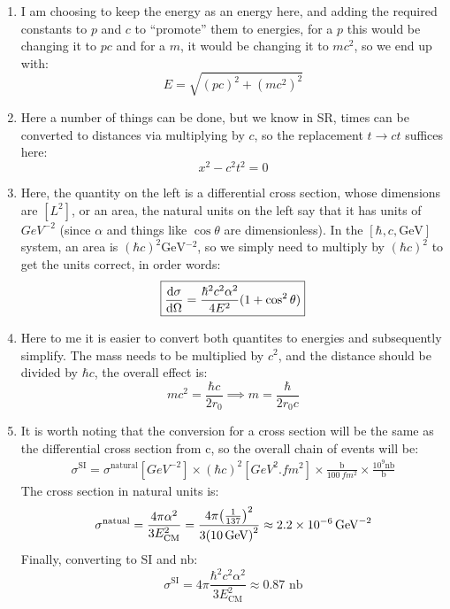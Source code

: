 \documentclass[12pt]{article}
\begin{document}
\begin{enumerate}[label = (\alph*)]
\item I am choosing to keep the energy as an energy here, and adding the required constants to $p$ and $c$ to ``promote'' them to energies, for a $p$ this would be changing it to $pc$ and for a $m$, it would be changing it to $mc^2$, so we end up with:
  \begin{equation}
    \label{eq:p1a}
    \boxed{E=\sqrt{{(pc)}^2+{(mc^2)}^2}}
  \end{equation}
\item Here a number of things can be done, but we know in SR, times can be converted to distances via multiplying by $c$, so the replacement $t\to ct$ suffices here:
  \begin{equation}
    \label{eq:p1c}
    \boxed{x^2-c^2t^2=0}
  \end{equation}
\item Here, the quantity on the left is a differential cross section, whose dimensions are $[L^2]$, or an area, the natural units on the left say that it has units of $\unit{GeV^{-2}}$ (since $\alpha$ and things like $\cos\theta$ are dimensionless). In the $[\hbar,c,\unit{\GeV}]$ system, an area is ${(\hbar c)}^2\unit{\GeV^{-2}}$, so we simply need to multiply by ${(\hbar c)}^2$ to get the units correct, in order words:
  \begin{equation}
    \label{eq:p2c}
    \boxed{\dv{\sigma}{\Omega}=\frac{\hbar^2c^2\alpha^2}{4E^2}(1+\cos^2\theta)}
  \end{equation}
\item Here to me it is easier to convert both quantites to energies and subsequently simplify. The mass needs to be multiplied by $c^2$, and the distance should be divided by $\hbar c$, the overall effect is:
  \begin{equation}
    \label{eq:p1d}
    mc^2=\frac{\hbar c}{2r_0}\implies
    \boxed{m=\frac{\hbar}{2r_0c}}
  \end{equation}
\item It is worth noting that the conversion for a cross section will be the same as the differential cross section from c, so the overall chain of events will be:
  \begin{align*}
    \sigma^{\text{SI}}=\sigma^{\text{natural}}[\unit{GeV^{-2}}]
    \times{(\hbar c)}^2[\unit{GeV^2.fm^2}]
    \times\frac{\text{b}}{\SI{100}{fm^2}}
    \times\frac{10^9\text{nb}}{\text{b}}
  \end{align*}
  The cross section in natural units is:
  \begin{align*}
    \sigma^{\text{natual}}=\frac{4\pi\alpha^2}{3E_{\text{CM}}^2}
    =\frac{4\pi{\qty(\frac1{137})}^2}{3{(\SI{10}{GeV})}^2}
    \approx\SI{2.2e-6}{GeV^{-2}}
  \end{align*}
  Finally, converting to SI and nb:
  \begin{equation}
    \label{eq:p1e}
    \boxed{\sigma^{\text{SI}}
      =4\pi\frac{\hbar^2c^2\alpha^2}{3E^2_{\text{CM}}}
      \approx0.87\text{ nb}}
  \end{equation}
\end{enumerate}
\newpage
\end{document}
